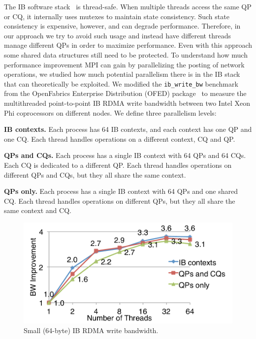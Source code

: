 The IB software stack~\cite{ofed} is thread-safe.  When multiple
threads access the same QP or CQ, it internally uses mutexes to
maintain state consistency.  Such state consistency is expensive,
however, and can degrade performance.  Therefore, in our approach we
try to avoid such usage and instead have different threads manage
different QPs in order to maximize performance.  Even with this
approach some shared data structures still need to be protected.  To
understand how much performance improvement MPI can gain by
parallelizing the posting of network operations, we studied how much
potential parallelism there is in the IB stack that can theoretically
be exploited.  We modified the {\tt ib\_write\_bw} benchmark from the
OpenFabrics Enterprise Distribution (OFED) package~\cite{ofed} to
measure the multithreaded point-to-point IB RDMA write bandwidth
between two Intel Xeon Phi coprocessors on different nodes.  We define
three parallelism levels:

\vspace{1.0ex}
\noindent\textbf{IB contexts.}  Each process has 64 IB contexts, and
each context has one QP and one CQ.  Each thread handles operations on
a different context, CQ and QP.

\vspace{1.0ex}
\noindent\textbf{QPs and CQs.}  Each process has a single IB context
with 64 QPs and 64 CQs.  Each CQ is dedicated to a different QP.  Each
thread handles operations on different QPs and CQs, but they all share
the same context.

\vspace{1.0ex}
\noindent\textbf{QPs only.}  Each process has a single IB context with
64 QPs and one shared CQ.  Each thread handles operations on different
QPs, but they all share the same context and CQ.

\begin{figure}[h]
\vspace{-2.0ex}
\centering
\includegraphics[width=0.8\columnwidth]{figures/mtmpi/imp-stp-ib-write-bw.pdf}
\vspace{-2.0ex}
\caption{Small (64-byte) IB RDMA write bandwidth.}
\label{fig:imp-ib-write-bw}
\vspace{-2.0ex}
\end{figure}


